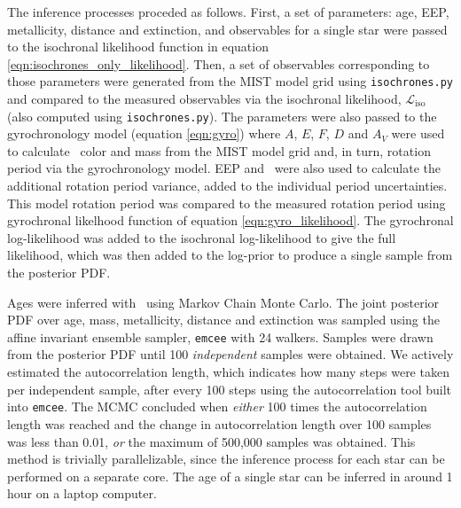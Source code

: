 The inference processes proceded as follows.
First, a set of parameters: age, EEP, metallicity, distance and extinction,
and observables for a single star were passed to the isochronal likelihood
function in equation \eqref{eqn:isochrones_only_likelihood}.
Then, a set of observables corresponding to those parameters were generated
from the MIST model grid using {\tt isochrones.py} \citep{isochrones} and
compared to the measured observables via the isochronal likelihood,
$\mathcal{L}_{\mathrm{iso}}$ (also computed using {\tt isochrones.py}).
The parameters were also passed to the gyrochronology model (equation
\ref{eqn:gyro}) where $A$, $E$,
$F$, $D$ and $A_V$ were used to calculate \gcolor\ color and mass from the
MIST model grid and, in turn, rotation period via the gyrochronology model.
EEP and \gcolor\ were also used to calculate the additional rotation period
variance, added to the individual period uncertainties.
This model rotation period was compared to the measured rotation period using
gyrochronal likelhood function of equation \ref{eqn:gyro_likelihood}.
The gyrochronal log-likelihood was added to the isochronal log-likelihood to
give the full likelihood, which was then added to the log-prior to produce a
single sample from the posterior PDF.

Ages were inferred with \sd\ using Markov Chain Monte Carlo.
The joint posterior PDF over age, mass, metallicity, distance and extinction
was sampled using the affine invariant ensemble sampler, {\tt emcee}
\citep{foreman-mackey2013} with 24 walkers.
Samples were drawn from the posterior PDF until 100 {\it independent} samples
were obtained.
We actively estimated the autocorrelation length, which indicates how many
steps were taken per independent sample, after every 100 steps using the
autocorrelation tool built into {\tt emcee}.
The MCMC concluded when {\it either} 100 times the autocorrelation length was
reached and the change in autocorrelation length over 100 samples was less
than 0.01, {\it or} the maximum of 500,000 samples was obtained.
This method is trivially parallelizable, since the inference process for each
star can be performed on a separate core.
The age of a single star can be inferred in around 1 hour on a laptop
computer.

